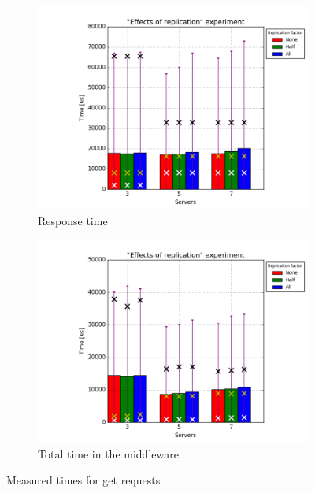 \documentclass[11pt]{article}
\begin{document}
\begin{figure}
\centering
\begin{subfigure}{.5\textwidth}
	\centering
	\includegraphics[width=\linewidth]{plots/replication-response_time-get}
	\caption{Response time}
	\label{fig:replication-response-time-get}
\end{subfigure}%
\begin{subfigure}{.5\textwidth}
	\centering
	\includegraphics[width=\linewidth]{plots/replication-get}
	\caption{Total time in the middleware}
	\label{fig:replication-get-middleware}
\end{subfigure}

\caption{Measured times for get requests}
\label{fig:replication-get}
\end{figure}
\end{document}
